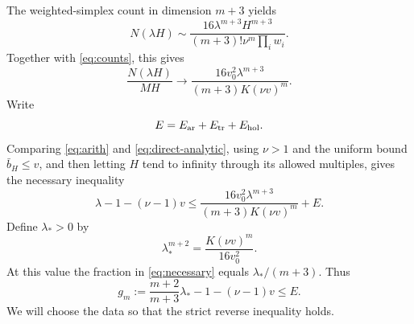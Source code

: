 The weighted-simplex count in dimension \(m+3\) yields
\[
 N(\lambda H)\sim
 \frac{16\lambda^{m+3}H^{m+3}}
              {(m+3)!\nu^m\prod_iw_i}.
\]
Together with \eqref{eq:counts}, this gives
\begin{equation}\label{eq:packing-limit}
 \frac{N(\lambda H)}{MH}\longrightarrow
       \frac{16v_0^2\lambda^{m+3}}{(m+3)K(\nu v)^m}.
\end{equation}
Write
\[
                            E=E_{\rm ar}+E_{\rm tr}+E_{\rm hol}.
\]
Comparing \eqref{eq:arith} and \eqref{eq:direct-analytic},
using \(\nu>1\) and the uniform bound \(\bar b_H\leq v\),
and then letting \(H\) tend to infinity through its allowed
multiples, gives the necessary inequality
\begin{equation}\label{eq:necessary}
 \lambda-1-(\nu-1)v
 \leq \frac{16v_0^2\lambda^{m+3}}{(m+3)K(\nu v)^m}+E.
\end{equation}
Define \(\lambda_*>0\) by
\begin{equation}\label{eq:lambda}
                   \lambda_*^{m+2}=\frac{K(\nu v)^m}{16v_0^2}.
\end{equation}
At this value the fraction in \eqref{eq:necessary} equals
\(\lambda_* /(m+3)\). Thus
\begin{equation}\label{eq:contradiction}
 g_m:=\frac{m+2}{m+3}\lambda_*-1-(\nu-1)v\leq E.
\end{equation}
We will choose the data so that the strict reverse inequality holds.
